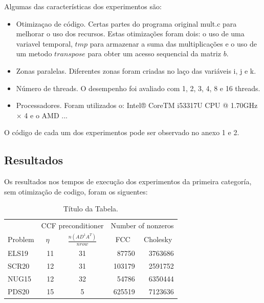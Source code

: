 \documentclass[12pt,fleqn]{article}
\begin{document}
Algumas das características dos experimentos são: 
\begin{itemize} 
\item Otimizaçao de código. Certas partes do programa original mult.c para melhorar o uso dos recursos. Estas otimizações foram dois: o uso de uma variavel temporal, $tmp$ para armazenar a suma das multiplicações e o uso de um metodo $transpose$ para obter um acesso sequencial da matriz $b$. 
\item Zonas paralelas. Diferentes zonas foram criadas no laço das variáveis i, j e k.  
\item Número de threads. O desempenho foi avaliado com 1, 2, 3, 4, 8 e 16 threads.   
\item Processadores. Foram utilizados o: Intel® CoreTM i5­3317U CPU @ 1.70GHz × 4 e o AMD ... 
\end{itemize} 
O código de cada um dos experimentos pode ser observado no anexo 1 e 2.  
\subsection{Resultados} 
Os resultados nos tempos de execução dos experimentos da primeira categoría, sem otimização de codigo, foram os siguentes: 
\begin{table}[htb] 
\begin{center} 
\begin{tabular}{|l|r|c|r|r|} \hline 
 
& \multicolumn{2}{|c|}{{CCF preconditioner}} & \multicolumn{2}{|c|}{{Number of nonzeros}} \\ \cline{2­5} 
{Problem}   & \multicolumn{1}{|c|}{$\eta$}  & \multicolumn{1}{|c|}{$ \frac{n(AD^{­1}A^T)}{nrow}$} & \multicolumn{1}{|c|}{FCC} & \multicolumn{1}{|c|}{Cholesky}  \\ \hline \hline 
ELS­19 &  ­11 & 31 &  87750  & 3763686  \\\hline 
SCR20  &  ­12 & 31 &  103179 & 2591752  \\\hline 
NUG15  &  ­12 & 32 &  54786  & 6350444 \\\hline 
PDS­20 &   15 & 5  &  625519 & 7123636\\\hline 
\end{tabular} 
\caption{Título da Tabela.}   
\label{tabn} 
\end{center} 
\end{table} 
 
\end{document}
